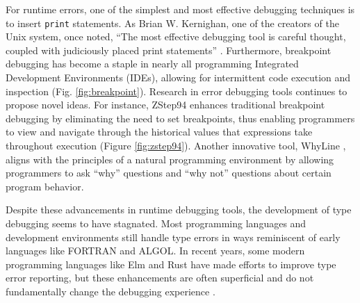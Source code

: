 For runtime errors, one of the simplest and most effective debugging techniques is to insert \texttt{print} statements. As Brian W. Kernighan, one of the creators of the Unix system, once noted, ``The most effective debugging tool is careful thought, coupled with judiciously placed print statements'' \cite{Kernighan1978-xs}. Furthermore, breakpoint debugging has become a staple in nearly all programming Integrated Development Environments (IDEs), allowing for intermittent code execution and inspection (Fig. \ref{fig:breakpoint}). Research in error debugging tools continues to propose novel ideas. For instance, ZStep94 \cite{Lieberman1995-lg} enhances traditional breakpoint debugging by eliminating the need to set breakpoints, thus enabling programmers to view and navigate through the historical values that expressions take throughout execution (Figure \ref{fig:zstep94}). Another innovative tool, WhyLine \cite{Ko2009-uf}, aligns with the principles of a natural programming environment \cite{Myers2004-fy} by allowing programmers to ask ``why'' questions and ``why not'' questions about certain program behavior.

Despite these advancements in runtime debugging tools, the development of type debugging seems to have stagnated. Most programming languages and development environments still handle type errors in ways reminiscent of early languages like FORTRAN and ALGOL. In recent years, some modern programming languages like Elm and Rust have made efforts to improve type error reporting, but these enhancements are often superficial and do not fundamentally change the debugging experience \cite{Ferdowsi2023-au}.


